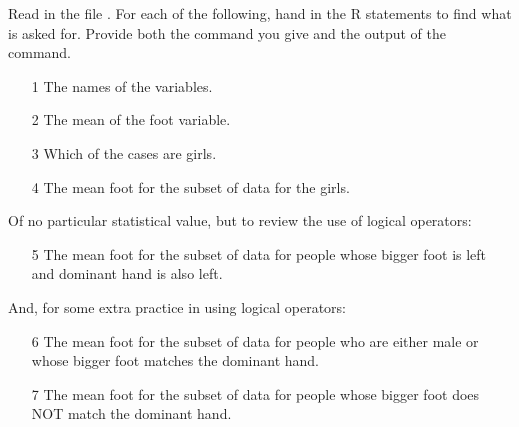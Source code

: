 
Read in the file .  For each of the following, hand
in the R statements to find what is asked for.  Provide both the
command you give and the output of the command.

\begin{itemize}

\item[1] The names of the variables.\TextEntry[itemname=names]

\item[2] The mean of the foot  variable.\TextEntry[itemname=width]

\item[3] Which of the cases are girls.\TextEntry[itemname=girls]

\item[4] The mean foot  for the subset of data for the
  girls.\TextEntry[itemname=girlfeet]

\end{itemize}

Of no particular statistical value, but to review the use of logical
operators: 

\begin{itemize}

\item[5] The mean foot  for the subset of data for people
whose bigger foot is left and dominant hand is also left.\TextEntry

\end{itemize}

And, for some extra practice in using logical operators:

\begin{itemize}
\item[6] The mean foot  for the subset of data for people
who are either male or whose bigger foot matches the dominant hand. 
\TextEntry

\item[7] The mean foot  for the subset of data for people
whose bigger foot does NOT match the dominant hand.\TextEntry

\end{itemize}

